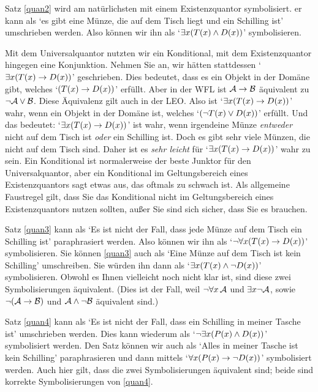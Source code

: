 Satz \ref{quan2} wird am natürlichsten mit einem Existenzquantor symbolisiert.
er kann als `es gibt eine Münze, die auf dem Tisch liegt und ein Schilling ist' umschrieben werden. Also können wir ihn als `$\exists x(\mathord{T}(x) \wedge \mathord{D}(x))$' symbolisieren.

Mit dem Universalquantor nutzten wir ein Konditional, mit dem Existenzquantor hingegen eine Konjunktion. Nehmen Sie an, wir hätten stattdessen `$\exists x(\mathord{T}(x) \rightarrow \mathord{D}(x))$' geschrieben. Dies bedeutet, dass es ein Objekt in der Domäne gibt, welches `$(\mathord{T}(x) \rightarrow \mathord{D}(x))$' erfüllt. Aber in der WFL ist $\mathcal{A} \rightarrow \mathcal{B}$ äquivalent zu $\neg\mathcal{A} \vee \mathcal{B}$. Diese Äquivalenz gilt auch in der LEO. Also ist `$\exists x(\mathord{T}(x) \rightarrow \mathord{D}(x))$' wahr, wenn ein Objekt in der Domäne ist, welches `$(\neg \mathord{T}(x) \vee \mathord{D}(x))$' erfüllt. Und das bedeutet: `$\exists x (\mathord{T}(x) \rightarrow \mathord{D}(x))$' ist wahr, wenn irgendeine Münze \emph{entweder} nicht auf dem Tisch ist \emph{oder} ein Schilling ist. Doch es gibt sehr viele Münzen, die nicht auf dem Tisch sind. Daher ist es \emph{sehr leicht} für `$\exists x(\mathord{T}(x) \rightarrow \mathord{D}(x))$' wahr zu sein. Ein Konditional ist normalerweise der beste Junktor für den Universalquantor, aber ein Konditional im Geltungsbereich eines Existenzquantors sagt etwas aus, das oftmals zu schwach ist. Als allgemeine Faustregel gilt, dass Sie das Konditional nicht im Geltungsbereich eines Existenzquantors nutzen sollten, au{\ss}er Sie sind sich sicher, dass Sie es brauchen.

Satz \ref{quan3} kann als `Es ist nicht der Fall, dass jede Münze auf dem Tisch ein Schilling ist' paraphrasiert werden. Also können wir ihn als `$\neg \forall x(\mathord{T}(x) \rightarrow \mathord{D}(x))$' symbolisieren. Sie können \ref{quan3} auch als `Eine Münze auf dem Tisch ist kein Schilling' umschreiben. Sie würden ihn dann als `$\exists x(\mathord{T}(x) \wedge \neg \mathord{D}(x))$' symbolisieren. Obwohl es Ihnen vielleicht noch nicht klar ist, sind diese zwei Symbolisierungen äquivalent. (Dies ist der Fall, weil $\neg\forall x\,\mathcal{A}$ und $\exists x\neg\mathcal{A}$, sowie $\neg(\mathcal{A}\rightarrow\mathcal{B})$ und $\mathcal{A}\wedge\neg\mathcal{B}$ äquivalent sind.)

Satz \ref{quan4} kann als `Es ist nicht der Fall, dass ein Schilling in meiner Tasche ist' umschrieben werden. Dies kann wiederum als `$\neg\exists x(\mathord{P}(x) \wedge \mathord{D}(x))$' symbolisiert werden. Den Satz können wir auch als `Alles in meiner Tasche ist kein Schilling' paraphrasieren und dann mittels `$\forall x(\mathord{P}(x) \rightarrow \neg \mathord{D}(x))$' symbolisiert werden. Auch hier gilt, dass die zwei Symbolisierungen äquivalent sind; beide sind korrekte Symbolisierungen von \ref{quan4}.

